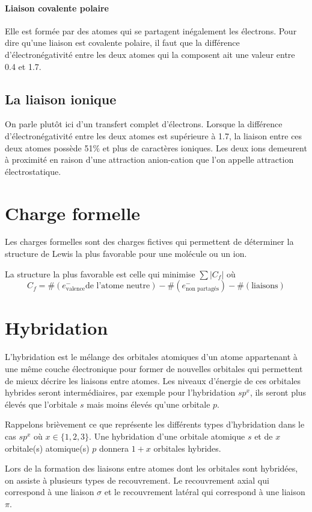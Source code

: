 \paragraph{Liaison covalente polaire} Elle est formée par des atomes qui se partagent inégalement les électrons.
Pour dire qu'une liaison est covalente polaire, il faut que la différence d'électronégativité entre les deux atomes qui la composent ait une valeur entre 0.4 et 1.7.

\subsection{La liaison ionique}
On parle plutôt ici d'un transfert complet d'électrons.
Lorsque la différence d'électronégativité entre les deux atomes est supérieure à 1.7, la liaison entre ces deux atomes possède 51$\%$ et plus de caractères ioniques.
Les deux ions demeurent à proximité en raison d'une attraction anion-cation que l'on appelle attraction électrostatique.

\section{Charge formelle}
Les charges formelles sont des charges fictives qui permettent de 
déterminer la structure de Lewis la plus favorable pour une molécule
ou un ion. 

La structure la plus favorable est celle qui minimise $\sum |C_f|$
où
\[ C_f = \#(e^-_{\text{valence}} \text{de l'atome neutre}) 
- \#(e^-_{\text{non partagés}}) - \#(\text{liaisons}) \]

\section{Hybridation}
L'hybridation est le mélange des orbitales atomiques d'un atome 
appartenant à une même couche électronique pour former de 
nouvelles orbitales qui permettent de mieux décrire les liaisons entre atomes.
Les niveaux d'énergie de ces orbitales hybrides seront intermédiaires, 
par exemple pour l'hybridation $sp^x$, 
ils seront plus élevés que l'orbitale $s$ mais moins élevés qu'une orbitale $p$.

Rappelons brièvement ce que représente les différents types d'hybridation 
dans le cas $sp^x$ où $x \in \{1,2,3\}$.
Une hybridation d'une orbitale atomique $s$ et de $x$ orbitale(s) atomique(s) $p$
donnera $1+x$ orbitales hybrides. 

Lors de la formation des liaisons entre atomes dont les orbitales sont hybridées,
on assiste à plusieurs types de recouvrement. 
Le recouvrement axial qui correspond à une liaison $\sigma$ 
et le recouvrement latéral qui correspond à une liaison $\pi$.

